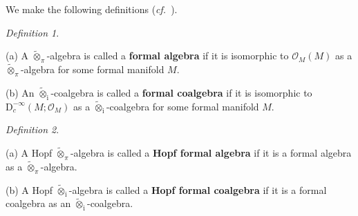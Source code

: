 \documentclass[12pt, a4paper]{amsart}
\newcommand{\RD}{{\mathrm {D}}}
\newcommand{\wt}{\widetilde}
\newcommand{\cf}{\textit{cf.}~}
\theoremstyle{Theorem}
\theoremstyle{Theorem}
\theoremstyle{Theorem}
\theoremstyle{Theorem}
\theoremstyle{Plain}
\theoremstyle{remark}
\theoremstyle{remark}
\theoremstyle{Definition}
\newtheorem{dfn}{Definition}[section]
\numberwithin{equation}{section}
\begin{document}
We make the following definitions (\cf \cite[Definitions 1.9 and 1.10]{CSW4}).

\begin{dfn}\label{def:foralg}

\noindent(a) A  $\wt{\otimes}_{\pi}$-algebra is called a \textbf{formal algebra} if it is isomorphic to $\mathcal{O}_M(M)$ as a  $\wt{\otimes}_{\pi}$-algebra for some formal manifold $M$.
    
\noindent(b) An  $\wt{\otimes}_{\mathrm{i}}$-coalgebra is called a \textbf{formal coalgebra} if it is isomorphic to $\RD_c^{-\infty}(M;\mathcal{O}_M)$ as  a $\wt{\otimes}_{\mathrm{i}}$-coalgebra for some formal manifold $M$.
\end{dfn}

\begin{dfn}\label{def:formalHopfalg}

\noindent(a) A Hopf $\wt{\otimes}_{\pi}$-algebra is called a \textbf{Hopf formal algebra} if it is a formal algebra as a $\wt{\otimes}_{\pi}$-algebra.
    
\noindent(b) A Hopf $\wt{\otimes}_{\mathrm{i}}$-algebra is called a \textbf{Hopf formal coalgebra} if it is a formal coalgebra as an $\wt{\otimes}_{\mathrm{i}}$-coalgebra.
\end{dfn}
\end{document}
